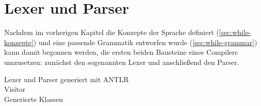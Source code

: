 \chapter{Lexer und Parser}
Nachdem im vorherigen Kapitel die Konzepte der Sprache definiert (\cref{sec:while-konzepte}) und eine passende Grammatik entworfen wurde (\cref{sec:while-grammar}) kann damit begonnen werden, die ersten beiden Bausteine eines Compilers umzusetzen: zunächst den sogenannten Lexer und anschließend den Parser.







Lexer und Parser generiert mit ANTLR\\
Visitor\\
Generierte Klassen\\